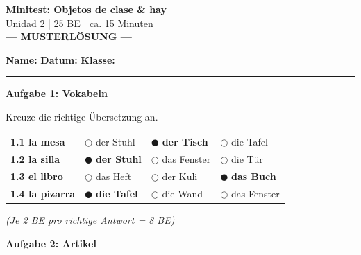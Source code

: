 \documentclass[11pt,a4paper]{article}
\newcommand{\luecke}[1]{\underline{\hspace{#1}}}
\newcommand{\lsg}[1]{\textcolor{loesung}{\textbf{#1}}}
\newcommand{\punktebox}[1]{\hfill\fbox{\small \_/#1}}
\newcommand{\kreisLeer}{$\bigcirc$}
\newcommand{\kreisVoll}{\textcolor{loesung}{$\CIRCLE$}}
\begin{document}
\begin{center}
{\Large\textcolor{fach}{\textbf{Minitest: Objetos de clase \& hay}}}\\[0.3cm]
{\normalsize Unidad 2 | 25 BE | ca. 15 Minuten}\\[0.2cm]
{\large\textcolor{loesung}{\textbf{--- MUSTERLÖSUNG ---}}}
\end{center}

\vspace{0.3cm}
\noindent\textbf{Name:} \luecke{5cm} \hfill \textbf{Datum:} \luecke{3cm} \hfill \textbf{Klasse:} \luecke{2cm}

\vspace{0.3cm}
\hrule
\vspace{0.5cm}

\noindent\textbf{Aufgabe 1: Vokabeln} \punktebox{8}

\noindent Kreuze die richtige Übersetzung an.

\vspace{0.3cm}

\begin{tabular}{p{3cm}p{4cm}p{4cm}p{4cm}}
\textbf{1.1 la mesa} & \kreisLeer{} der Stuhl & \kreisVoll{} \lsg{der Tisch} & \kreisLeer{} die Tafel \\[0.5em]
\textbf{1.2 la silla} & \kreisVoll{} \lsg{der Stuhl} & \kreisLeer{} das Fenster & \kreisLeer{} die Tür \\[0.5em]
\textbf{1.3 el libro} & \kreisLeer{} das Heft & \kreisLeer{} der Kuli & \kreisVoll{} \lsg{das Buch} \\[0.5em]
\textbf{1.4 la pizarra} & \kreisVoll{} \lsg{die Tafel} & \kreisLeer{} die Wand & \kreisLeer{} das Fenster \\
\end{tabular}

\textcolor{loesung}{\textit{(Je 2 BE pro richtige Antwort = 8 BE)}}

\vspace{0.8cm}

\noindent\textbf{Aufgabe 2: Artikel} \punktebox{6}
\end{document}

